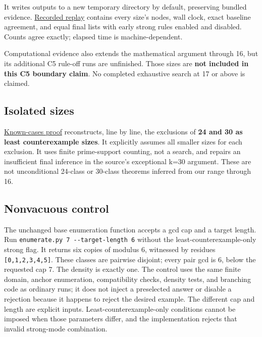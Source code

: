 \documentclass[11pt,a4paper]{article}
\begin{document}
It writes outputs to a new temporary directory by default, preserving bundled evidence. \href{https://github.com/mpelteshki/climbing-to-the-frontier/blob/ed55f76eb8c558825bb629fd2cd8dbf46e5f1314/cagent/p4/audit/replay-evidence-9-14.json}{Recorded replay} contains every size's nodes, wall clock, exact baseline agreement, and equal final lists with early strong rules enabled and disabled. Counts agree exactly; elapsed time is machine-dependent.

Computational evidence also extends the mathematical argument through 16, but its additional C5 rule-off runs are unfinished. Those sizes are \textbf{not included in this C5 boundary claim}. No completed exhaustive search at 17 or above is claimed.

\subsection{Isolated sizes}\label{isolated-sizes}

\href{https://github.com/mpelteshki/climbing-to-the-frontier/blob/ed55f76eb8c558825bb629fd2cd8dbf46e5f1314/cagent/p4/c5/known-cases.md}{Known-cases proof} reconstructs, line by line, the exclusions of \textbf{24 and 30 as least counterexample sizes}. It explicitly assumes all smaller sizes for each exclusion. It uses finite prime-support counting, not a search, and repairs an insufficient final inference in the source's exceptional k=30 argument. These are not unconditional 24-class or 30-class theorems inferred from our range through 16.

\subsection{Nonvacuous control}\label{nonvacuous-control}

The unchanged base enumeration function accepts a gcd cap and a target length. Run \texttt{enumerate.py\ 7\ -\/-target-length\ 6} without the least-counterexample-only strong flag. It returns six copies of modulus 6, witnessed by residues \texttt{{[}0,1,2,3,4,5{]}}. These classes are pairwise disjoint; every pair gcd is 6, below the requested cap 7. The density is exactly one. The control uses the same finite domain, anchor enumeration, compatibility checks, density tests, and branching code as ordinary runs; it does not inject a preselected answer or disable a rejection because it happens to reject the desired example. The different cap and length are explicit inputs. Least-counterexample-only conditions cannot be imposed when those parameters differ, and the implementation rejects that invalid strong-mode combination.
\end{document}
